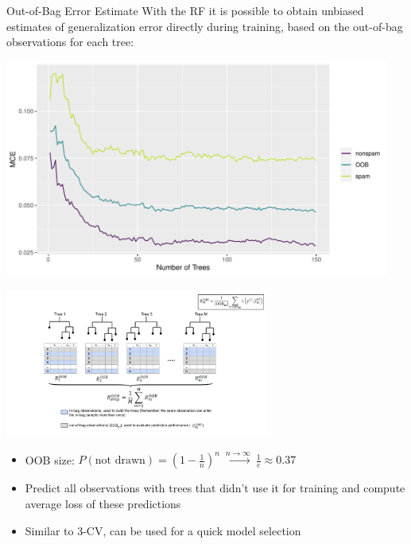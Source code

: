 \documentclass[11pt,compress,t,notes=noshow, xcolor=table]{beamer}
\newenvironment{knitrout}{}{} %
\begin{document}
\begin{vbframe}{Out-of-Bag Error Estimate}
With the RF it is possible to obtain unbiased estimates of generalization error directly
during training, based on the out-of-bag observations for each tree:

\begin{knitrout}\scriptsize
{}\color{fgcolor}

{\centering \includegraphics[width=0.95\textwidth]{figure/cart_forest_intro_4} 

}



\end{knitrout}

\framebreak

\begin{center}
\includegraphics[width=0.65\textwidth]{figure_man/rF_oob_error_new.pdf}
\end{center}

\begin{itemize}
  \item OOB size: $P(\text{not drawn}) = \left(1 - \frac{1}{n}\right)^n \ \stackrel{n \to \infty}{\longrightarrow} \ \frac{1}{e} \approx 0.37$
  \item Predict all observations with trees that didn't use it for training and compute average loss of these predictions
  \item Similar to 3-CV, can be used for a quick model selection
\end{itemize}


\end{vbframe}

\endlecture
\end{document}
